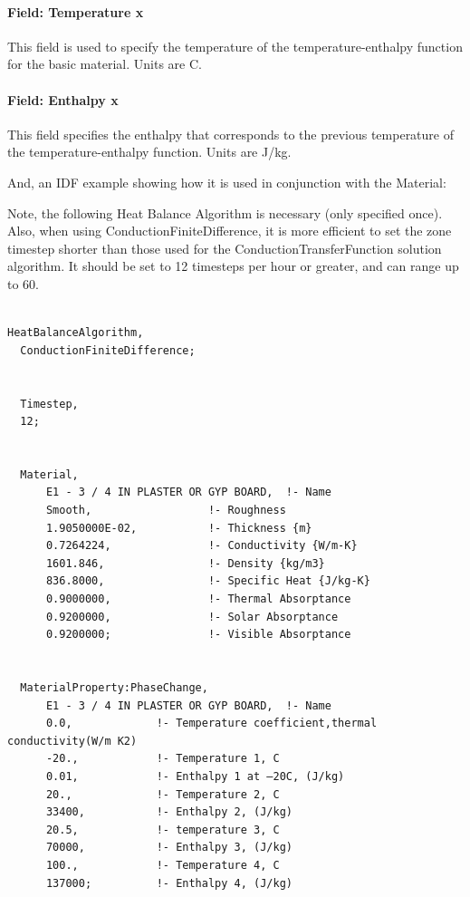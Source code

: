 \paragraph{Field: Temperature x}\label{field-temperature-x}

This field is used to specify the temperature of the temperature-enthalpy function for the basic material. Units are C.

\paragraph{Field: Enthalpy x}\label{field-enthalpy-x}

This field specifies the enthalpy that corresponds to the previous temperature of the temperature-enthalpy function. Units are J/kg.

And, an IDF example showing how it is used in conjunction with the Material:

Note, the following Heat Balance Algorithm is necessary (only specified once). Also, when using ConductionFiniteDifference, it is more efficient to set the zone timestep shorter than those used for the ConductionTransferFunction solution algorithm. It should be set to 12 timesteps per hour or greater, and can range up to 60.

\begin{lstlisting}

HeatBalanceAlgorithm,
  ConductionFiniteDifference;


  Timestep,
  12;


  Material,
      E1 - 3 / 4 IN PLASTER OR GYP BOARD,  !- Name
      Smooth,                  !- Roughness
      1.9050000E-02,           !- Thickness {m}
      0.7264224,               !- Conductivity {W/m-K}
      1601.846,                !- Density {kg/m3}
      836.8000,                !- Specific Heat {J/kg-K}
      0.9000000,               !- Thermal Absorptance
      0.9200000,               !- Solar Absorptance
      0.9200000;               !- Visible Absorptance


  MaterialProperty:PhaseChange,
      E1 - 3 / 4 IN PLASTER OR GYP BOARD,  !- Name
      0.0,             !- Temperature coefficient,thermal conductivity(W/m K2)
      -20.,            !- Temperature 1, C
      0.01,            !- Enthalpy 1 at –20C, (J/kg)
      20.,             !- Temperature 2, C
      33400,           !- Enthalpy 2, (J/kg)
      20.5,            !- temperature 3, C
      70000,           !- Enthalpy 3, (J/kg)
      100.,            !- Temperature 4, C
      137000;          !- Enthalpy 4, (J/kg)
\end{lstlisting}

